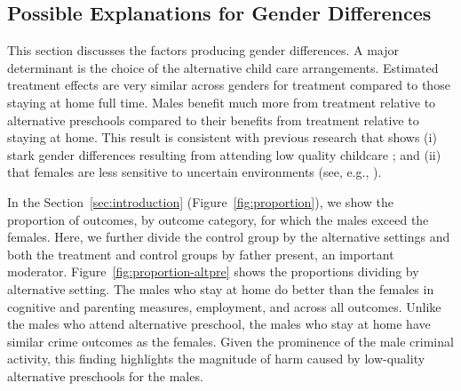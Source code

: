 \subsection{Possible Explanations for Gender Differences}

This section discusses the factors producing gender differences. A major determinant is the choice of the alternative child care arrangements. 
Estimated treatment effects are very similar across genders for treatment compared to those staying at home full time. Males benefit much more from treatment relative to alternative preschools compared to their benefits from treatment relative to staying at home. This result is consistent with previous research that shows (i) stark gender differences resulting from attending low quality childcare \citep{Kottelenberg-Lehrer_2014_Gender-Effects,Baker_Gruber_Milligan_2015_Noncog_Defects}; and (ii) that females are less sensitive to uncertain environments (see, e.g., \citealp{Autor-etal_2015_Family-Disadvantage}).

In the Section~\ref{sec:introduction} (Figure~\ref{fig:proportion}), we show the proportion of outcomes, by outcome category, for which the males exceed the females. Here, we further divide the control group by the alternative settings and both the treatment and control groups by father present, an important moderator. Figure~\ref{fig:proportion-altpre} shows the proportions dividing by alternative setting. The males who stay at home do better than the females in cognitive and parenting measures, employment, and across all outcomes. Unlike the males who attend alternative preschool, the males who stay at home have similar crime outcomes as the females. Given the prominence of the male criminal activity, this finding highlights the magnitude of harm caused by low-quality alternative preschools for the males. 

